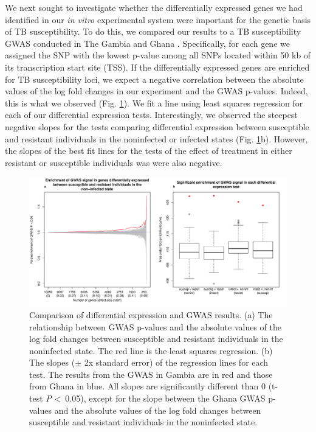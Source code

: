 \documentclass[fleqn,10pt]{wlscirep}
\begin{document}
We next sought to investigate whether the differentially expressed
genes we had identified in our \emph{in vitro} experimental system
were important for the genetic basis of TB susceptibility. To do this,
we compared our results to a TB susceptibility GWAS conducted in The
Gambia and Ghana \cite{Thye2010}. Specifically, for each gene we
assigned the SNP with the lowest p-value among all SNPs located within
50 kb of its transcription start site (TSS). If the differentially
expressed genes are enriched for TB susceptibility loci, we expect a
negative correlation between the absolute values of the log fold
changes in our experiment and the GWAS p-values. Indeed, this is what
we observed (Fig. \ref{fig:gwas}). We fit a line using least squares
regression for each of our differential expression tests.
Interestingly, we observed the steepest negative slopes for the tests
comparing differential expression between susceptible and resistant
individuals in the noninfected or infected states (Fig.
\ref{fig:gwas}b). However, the slopes of the best fit lines for the
tests of the effect of treatment in either resistant or susceptible
individuals was were also negative.

\begin{figure}[ht]
\centering
\includegraphics[width=\linewidth]{../figure/gwas.pdf}
\caption{
Comparison of differential expression and GWAS results. (a) The
relationship between GWAS p-values \cite{Thye2010} and the absolute
values of the log fold changes between susceptible and resistant
individuals in the noninfected state. The red line is the least
squares regression. (b) The slopes ($\pm$ 2x standard error) of the
regression lines for each test. The results from the GWAS in Gambia
are in red and those from Ghana in blue. All slopes are significantly
different than 0 (t-test \emph{P} \textless \, 0.05), except for the
slope between the Ghana GWAS p-values and the absolute values of the
log fold changes between susceptible and resistant individuals in the
noninfected state.
}
\label{fig:gwas}
\end{figure}
\end{document}
